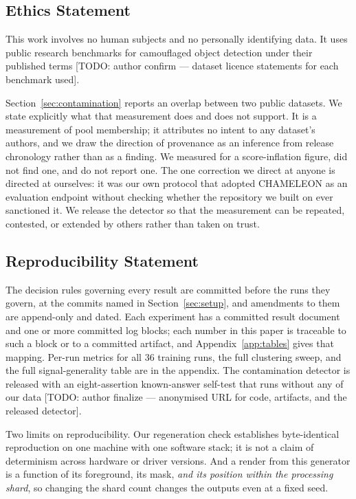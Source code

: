 \documentclass{article} %
\begin{document}
\subsection*{Ethics Statement}

This work involves no human subjects and no personally identifying data. It uses public research
benchmarks for camouflaged object detection under their published terms
[TODO: author confirm --- dataset licence statements for each benchmark used].

Section~\ref{sec:contamination} reports an overlap between two public datasets. We state explicitly
what that measurement does and does not support. It is a measurement of pool membership; it attributes
no intent to any dataset's authors, and we draw the direction of provenance as an inference from
release chronology rather than as a finding. We measured for a score-inflation figure, did not find
one, and do not report one. The one correction we direct at anyone is directed at ourselves: it was
our own protocol that adopted CHAMELEON as an evaluation endpoint without checking whether the
repository we built on ever sanctioned it. We release the detector so that the measurement can be
repeated, contested, or extended by others rather than taken on trust.

\subsection*{Reproducibility Statement}

The decision rules governing every result are committed before the runs they govern, at the commits
named in Section~\ref{sec:setup}, and amendments to them are append-only and dated. Each experiment
has a committed result document and one or more committed log blocks; each number in this paper is
traceable to such a block or to a committed artifact, and Appendix~\ref{app:tables} gives that
mapping. Per-run metrics for all $36$ training runs, the full clustering sweep, and the full
signal-generality table are in the appendix. The contamination detector is released with an
eight-assertion known-answer self-test that runs without any of our data
[TODO: author finalize --- anonymised URL for code, artifacts, and the released detector].

Two limits on reproducibility. Our regeneration check
establishes byte-identical reproduction on one machine with one software stack; it is not a claim of
determinism across hardware or driver versions. And a render from this generator is a function of its
foreground, its mask, \emph{and its position within the processing shard}, so changing the shard count
changes the outputs even at a fixed seed.
\end{document}
